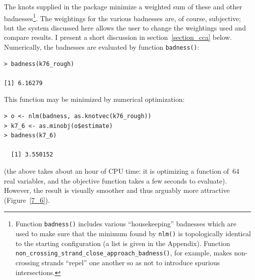 \documentclass{birkjour}
\theoremstyle{definition}
\theoremstyle{remark}
\numberwithin{equation}{section}
\begin{document}
The knots supplied in the package minimize a weighted sum of these and
other badnesses\footnote{Function {\tt badness()} includes various
``housekeeping'' badnesses which are used to make sure that the
minimum found by {\tt nlm()} is topologically identical to the
starting configuration (a list is given in the Appendix).  Function
{\tt non\_crossing\_strand\_close\_approach\_badness()}, for example,
makes non-crossing strands ``repel'' one another so as not to
introduce spurious intersections.}.  The weightings for the various
badnesses are, of course, subjective; but the system discussed here
allows the user to change the weightings used and compare results.  I
present a short discussion in section~\ref{section_cca} below.
Numerically, the badnesses are evaluated by function {\tt badness()}:

\begin{verbatim}
> badness(k76_rough)

[1] 6.16279
\end{verbatim}

This function may be minimized by numerical optimization:

\begin{verbatim}
> o <- nlm(badness, as.knotvec(k76_rough))
> k7_6 <- as.minobj(o$estimate)
> badness(k7_6)

  [1] 3.550152
\end{verbatim}

(the above takes about an hour of CPU time: it is optimizing a
function of~64 real variables, and the objective function takes a few
seconds to evaluate).  However, the result is visually smoother and
thus arguably more attractive (Figure~\ref{7_6}).
\end{document}
